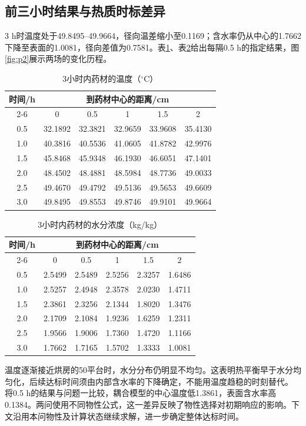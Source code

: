 \subsection{前三小时结果与热质时标差异}
3 h时温度处于49.8495--49.9664\tempunit，径向温差缩小至0.1169\tempunit；含水率仍从中心的1.7662\cunit 下降至表面的1.0081\cunit，径向差值为0.7581\cunit。表\ref{tab:p2T}、表\ref{tab:p2C}给出每隔0.5 h的指定结果，图\ref{fig:p2}展示两场的变化历程。
\begin{table}[!htbp]\centering
\caption{3小时内药材的温度（$^{\circ}$C）}\label{tab:p2T}
\begin{tabular}{cccccc}\toprule
\multirow[c]{2}{*}{时间/h}&\multicolumn{5}{c}{到药材中心的距离/cm}\\\cmidrule(lr){2-6}
&0&0.5&1&1.5&2\\\midrule
0.5&32.1892&32.3821&32.9659&33.9608&35.4130\\
1.0&40.3816&40.5536&41.0605&41.8782&42.9976\\
1.5&45.8468&45.9348&46.1930&46.6051&47.1401\\
2.0&48.4502&48.4881&48.5984&48.7736&49.0033\\
2.5&49.4670&49.4792&49.5136&49.5653&49.6609\\
3.0&49.8495&49.8553&49.8746&49.9101&49.9664\\\bottomrule
\end{tabular}\end{table}
\begin{table}[!htbp]\centering
\caption{3小时内药材的水分浓度（kg/kg）}\label{tab:p2C}
\begin{tabular}{cccccc}\toprule
\multirow[c]{2}{*}{时间/h}&\multicolumn{5}{c}{到药材中心的距离/cm}\\\cmidrule(lr){2-6}
&0&0.5&1&1.5&2\\\midrule
0.5&2.5499&2.5489&2.5256&2.3257&1.6486\\
1.0&2.5257&2.4948&2.3578&2.0230&1.4711\\
1.5&2.3861&2.3256&2.1344&1.8020&1.3476\\
2.0&2.1709&2.1084&1.9236&1.6259&1.2311\\
2.5&1.9566&1.9006&1.7360&1.4720&1.1166\\
3.0&1.7662&1.7165&1.5702&1.3333&1.0081\\\bottomrule
\end{tabular}\end{table}

温度逐渐接近烘房的50\tempunit 平台时，水分分布仍明显不均匀。这表明热平衡早于水分均匀化，后续达标时间须由内部含水率的下降确定，不能用温度趋稳的时刻替代。
将0.5 h的结果与问题一比较，耦合模型的中心温度低1.3861\tempunit，表面含水率高0.1384\cunit。两问使用不同物性公式，这一差异反映了物性选择对初期响应的影响。下文沿用本问物性及计算状态继续求解，进一步确定整体达标时间。
\FloatBarrier


